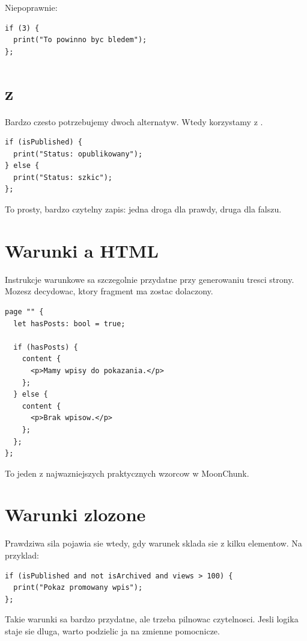 Niepoprawnie:

\begin{lstlisting}[style=moonchunk,caption={Niepoprawny warunek niebedacy bool}]
if (3) {
  print("To powinno byc bledem");
};
\end{lstlisting}

\section{ z }
Bardzo czesto potrzebujemy dwoch alternatyw. Wtedy korzystamy z .

\begin{lstlisting}[style=moonchunk,caption={Pelny warunek if-else}]
if (isPublished) {
  print("Status: opublikowany");
} else {
  print("Status: szkic");
};
\end{lstlisting}

To prosty, bardzo czytelny zapis: jedna droga dla prawdy, druga dla falszu.

\section{Warunki a HTML}
Instrukcje warunkowe sa szczegolnie przydatne przy generowaniu tresci strony.
Mozesz decydowac, ktory fragment  ma zostac dolaczony.

\begin{lstlisting}[style=moonchunk,caption={Warunkowe generowanie fragmentu strony}]
page "" {
  let hasPosts: bool = true;

  if (hasPosts) {
    content {
      <p>Mamy wpisy do pokazania.</p>
    };
  } else {
    content {
      <p>Brak wpisow.</p>
    };
  };
};
\end{lstlisting}

To jeden z najwazniejszych praktycznych wzorcow w MoonChunk.

\section{Warunki zlozone}
Prawdziwa sila  pojawia sie wtedy, gdy warunek sklada sie z kilku elementow.
Na przyklad:

\begin{lstlisting}[style=moonchunk,caption={Zlozony warunek logiczny}]
if (isPublished and not isArchived and views > 100) {
  print("Pokaz promowany wpis");
};
\end{lstlisting}

Takie warunki sa bardzo przydatne, ale trzeba pilnowac czytelnosci. Jesli logika staje
sie dluga, warto podzielic ja na zmienne pomocnicze.

